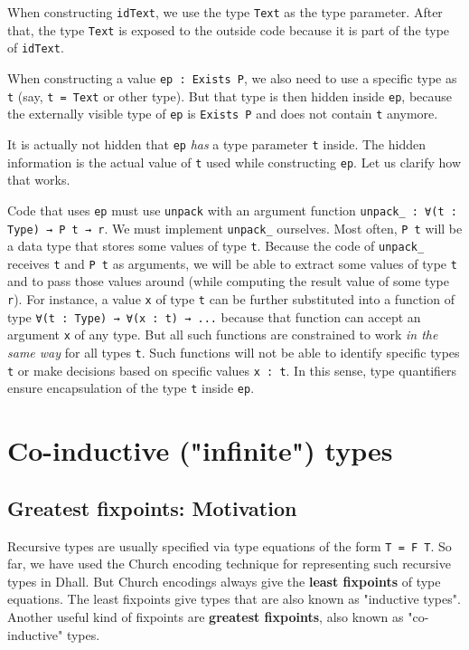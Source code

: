 When constructing \lstinline!idText!, we use the type \lstinline!Text! as the type parameter.
After that, the type \lstinline!Text! is exposed to the outside code because it is part of the type of \lstinline!idText!.


When constructing a value \lstinline!ep : Exists P!, we also need to use a specific type as \lstinline!t! (say, \lstinline!t = Text! or other type).
But that type is then hidden inside \lstinline!ep!, because the externally visible type of \lstinline!ep! is \lstinline!Exists P! and does not contain \lstinline!t! anymore.  


It is actually not hidden that \lstinline!ep! \emph{has} a type parameter \lstinline!t! inside.
The hidden information is the actual value of \lstinline!t! used while constructing \lstinline!ep!.
Let us clarify how that works.


Code that uses \lstinline!ep! must use \lstinline!unpack! with an argument function \lstinline!unpack_ : ∀(t : Type) → P t → r!.
We must implement \lstinline!unpack_! ourselves.
Most often, \lstinline!P t! will be a data type that stores some values of type \lstinline!t!.
Because the code of \lstinline!unpack_! receives \lstinline!t! and \lstinline!P t! as arguments, we will be able to extract some values of type \lstinline!t! and to pass those values around (while computing the result value of some type \lstinline!r!).
For instance, a value \lstinline!x! of type \lstinline!t! can be further substituted into a function of type \lstinline!∀(t : Type) → ∀(x : t) → ...! because that function can accept an argument \lstinline!x! of any type.
But all such functions are constrained to work \emph{in the same way} for all types \lstinline!t!.
Such functions will not be able to identify specific types \lstinline!t! or make decisions based on specific values \lstinline!x : t!.
In this sense, type quantifiers ensure encapsulation of the type \lstinline!t! inside \lstinline!ep!.


\section{Co-inductive ("infinite") types}


\subsection{Greatest fixpoints: Motivation}


Recursive types are usually specified via type equations of the form \lstinline!T = F T!.
So far, we have used the Church encoding technique for representing such recursive types in Dhall.
But Church encodings always give the \textbf{least fixpoints} of type equations.
The least fixpoints give types that are also known as "inductive types".
Another useful kind of fixpoints are \textbf{greatest fixpoints}, also known as "co-inductive" types.


